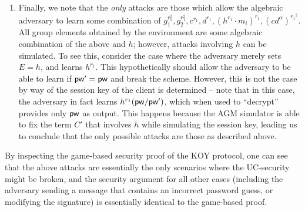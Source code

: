 \begin{enumerate}
	\item Finally, we note that the \textit{only} attacks are those which allow the algebraic adversary to learn some combination of $g_1^{r_1^2}, g_2^{r_1^2}, c^{r_1}, d^{r_1},(h^{r_1}\cdot m_i)^{r_1},(cd^{\alpha})^{{r_1}^2}$. All group elements obtained by the environment are some algebraic combination of the above and $h$; however, attacks involving $h$ can be simulated. To see this, consider the case where the adversary merely sets $E=h$, and learns $h^{r_1}$. This hypothetically should allow the adversary to be able to learn if $\mathsf{pw}'=\mathsf{pw}$ and break the scheme. However, this is not the case by way of the session key of the client is determined -- note that in this case, the adversary in fact learns $h^{r_1}(\mathsf{pw}/\mathsf{pw}')$, which when used to ``decrypt'' provides only $\mathsf{pw}$ as output. This happens because the AGM simulator is able to fix the term $C'$ that involves $h$ while simulating the session key, leading us to conclude that the only possible attacks are those as described above.
\end{enumerate}
By inspecting the game-based security proof of the KOY protocol, one can see that the above attacks are essentially the only scenarios where the UC-security might be broken, and the security argument for all other cases (including the adversary sending a message that contains an incorrect password guess, or modifying the signature) is essentially identical to the game-based proof. 